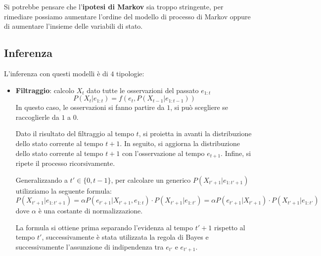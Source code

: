 Si potrebbe pensare che l'\textbf{ipotesi di Markov} sia troppo stringente, per
rimediare possiamo aumentare l'ordine del modello di processo di Markov oppure di
aumentare l'insieme delle variabili di stato.
\subsection{Inferenza}
L'inferenza con questi modelli è di $4$ tipologie:
\begin{itemize}
    \item \textbf{Filtraggio}: calcolo $X_t$ dato tutte le osservazioni del
          passato $e_{1:t}$
          \begin{equation}
              P(X_t | e_{1:t})= f(e_t, P(X_{t-1}|e_{1:t-1}))
          \end{equation}
          In questo caso, le osservazioni si fanno partire da $1$, si può
          scegliere se raccoglierle da $1$ a $0$.

          Dato il risultato del filtraggio al tempo $t$, si proietta in avanti
          la distribuzione dello stato corrente al tempo $t + 1$. In seguito, si
          aggiorna la distribuzione dello stato corrente al tempo $t + 1$ con
          l'osservazione al tempo $e_{t + 1}$. Infine, si ripete il processo
          ricorsivamente.

          Generalizzando a $t' \in \{0,t-1\}$, per calcolare un generico $P(X_{t'+1}|e_{1:t'+1})$
          utilizziamo la seguente formula:
          \begin{equation}
              P(X_{t'+1} | e_{1:t'+1}) = \alpha P(e_{t'+1}|X_{t'+1}, e_{1:t})\cdot P(X_{t' + 1}|e_{1:t'})
              =\alpha P(e_{t'+1}|X_{t'+1})\cdot P(X_{t'+1}|e_{1:t'})
          \end{equation}
          dove $\alpha$ è una costante di normalizzazione.

          La formula si ottiene prima separando l'evidenza al tempo $t'+1$
          rispetto al tempo $t'$, successivamente è stata utilizzata la regola
          di Bayes e successivamente l'assunzione di indipendenza tra $e_{t'}$ e
          $e_{t'+1}$.


\end{itemize}
